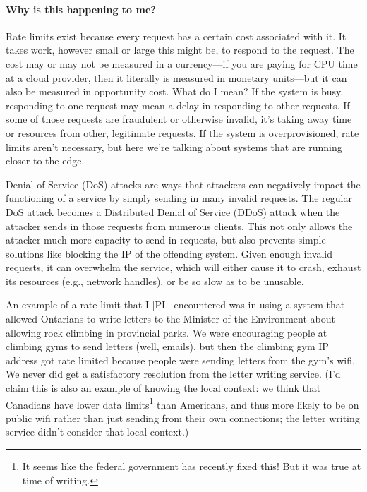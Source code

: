 \paragraph{Why is this happening to me?} Rate limits exist because every request has a certain cost associated with it. It takes work, however small or large this might be, to respond to the request. The cost may or may not be measured in a currency---if you are paying for CPU time at a cloud provider, then it literally is measured in monetary units---but it can also be measured in opportunity cost. What do I mean? If the system is busy, responding to one request may mean a delay in responding to other requests. If some of those requests are fraudulent or otherwise invalid, it's taking away time or resources from other, legitimate requests. If the system is overprovisioned, rate limits aren't necessary, but here we're talking about systems that are running closer to the edge.

Denial-of-Service (DoS) attacks are ways that attackers can negatively impact the functioning of a service by simply sending in many invalid requests. The regular DoS attack becomes a Distributed Denial of Service (DDoS) attack when the attacker sends in those requests from numerous clients. This not only allows the attacker much more capacity to send in requests, but also prevents simple solutions like blocking the IP of the offending system. Given enough invalid requests, it can overwhelm the service, which will either cause it to crash, exhaust its resources (e.g., network handles), or be so slow as to be unusable.

An example of a rate limit that I [PL] encountered was in using a system that allowed Ontarians to write letters to the Minister of the Environment about allowing rock climbing in provincial parks. We were encouraging people at climbing gyms to send letters (well, emails), but then the climbing gym IP address got rate limited because people were sending letters from the gym's wifi. We never did get a satisfactory resolution from the letter writing service. (I'd claim this is also an example of knowing the local context: we think that Canadians have lower data limits\footnote{It seems like the federal government has recently fixed this! But it was true at time of writing.} than Americans, and thus more likely to be on public wifi rather than just sending from their own connections; the letter writing service didn't consider that local context.)

